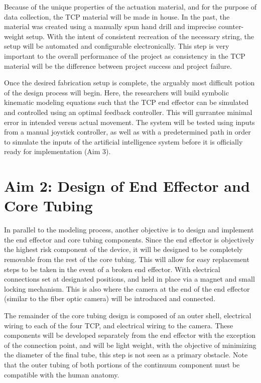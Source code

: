 	Because of the unique properties of the actuation material, and for the purpose of data collection, the TCP material will be made in house. In the past, the material was created using a manually spun hand drill and imprecise counter-weight setup. With the intent of consistent recreation of the necessary string, the setup will be automated and configurable electronically. This step is very important to the overall performance of the project as consistency in the TCP material will be the difference between project success and project failure.
	
	Once the desired fabrication setup is complete, the arguably most difficult potion of the design process will begin. Here, the researchers will build symbolic kinematic modeling equations such that the TCP end effector can be simulated and controlled using an optimal feedback controller. This will gurrantee minimal error in intended versus actual movement. The system will be tested using inputs from a manual joystick controller, as well as with a predetermined path in order to simulate the inputs of the artificial intelligence system before it is officially ready for implementation (Aim 3).
	
	\section{Aim 2: Design of End Effector and Core Tubing}
	\label{subsect:aim2}
	
	In parallel to the modeling process, another objective is to design and implement the end effector and core tubing components. Since the end effector is objectively the highest risk component of the device, it will be designed to be completely removable from the rest of the core tubing. This will allow for easy replacement steps to be taken in the event of a broken end effector. With electrical connections set at designated positions, and held in place via a magnet and small locking mechanism.	 This is also where the camera at the end of the end effector (similar to the fiber optic camera) will be introduced and connected.
	
	The remainder of the core tubing design is composed of an outer shell, electrical wiring to each of the four TCP, and electrical wiring to the camera. These components will be developed separately from the end effector with the exception of the connection point, and will be light weight, with the objective of minimizing the diameter of the final tube, this step is not seen as a primary obstacle. Note that the outer tubing of both portions of the continuum component must be compatible with the human anatomy.
	
